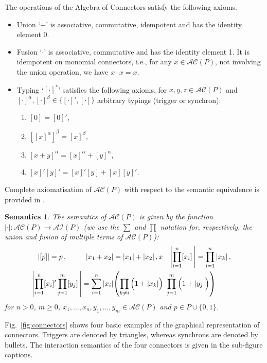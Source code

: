 \documentclass{llncs}
\newcommand{\fig}[1]{Fig.~\ref{fig:#1}}
\newcommand{\ie}[1][\ ]{i.e.#1}
\newtheorem*{semantics}{Semantics}
\newcommand{\ai}{\ensuremath{\mathcal{AI}}}
\newcommand{\ac}{\ensuremath{\mathcal{AC}}}
\begin{document}
The operations of the Algebra of Connectors satisfy the following
axioms.
\begin{itemize}
\item Union `$+$' is associative, commutative, idempotent and has the identity element 0.
\item Fusion `$\cdot$' is associative, commutative and has the identity element 1. It is idempotent on monomial connectors, \ie[,] for any $x \in \ac(P)$, not involving the union operation, we have $x\cdot x = x$.
\item Typing `$[\cdot]^*$' satisfies the following axioms, for $x,y,z
  \in \ac(P)$ and $[\cdot]^\alpha,[\cdot]^\beta \in \bigl\{[\cdot]', [\cdot]\bigr\}$ arbitrary typings (trigger or synchron):
  \begin{enumerate}
  \item $[0] = [0]'$,
  \item $[[x]^\alpha]^\beta = [x]^\beta$,
  \item $[x + y]^\alpha = [x]^\alpha + [y]^\alpha$,
  \item $[x]'[y]' = [x]'[y] + [x][y]'$.
  \end{enumerate}
\end{itemize}
Complete axiomatisation of $\ac(P)$ with respect to the semantic
equivalence is provided in \cite{BliSif08-acp-tc}.

\begin{semantics}
The semantics of $\ac(P)$ is given by the function $|\cdot| : \ac(P)
\rightarrow \ai(P)$ (we use the $\sum$ and $\prod$ notation for,
respectively, the union and fusion of multiple terms of $\ac(P)$):
%
\begin{align}
  \label{eq:acap}
  |[p]| & = p\,,
  & |x_1 + x_2| & = |x_1| + |x_2|\,,x
  & \left|\prod_{i=1}^n [x_i]\,\right| & = \prod_{i=1}^n |x_k|\,,
  \\
  \label{eq:acaptrig}
  && \hspace{-2cm}\left|\prod_{i=1}^n [x_i]' \prod_{j=1}^m [y_j]\,\right| = 
  \sum_{i=1}^n |x_i| & \lefteqn{\left(
  \prod_{k\not=i}\Big(1 + |x_k|\Big)\ \prod_{j=1}^m \Big(1 + |y_j|\Big)\right)}\,
\end{align}
%
for $n > 0$, $m \geq 0$, $x_1,\dots,x_n,y_1,\dots,y_m \in \ac(P)$ and
$p\in P\cup \{0,1\}$.
\end{semantics}

\fig{connectors} shows four basic examples of the graphical
representation of connectors.  Triggers are denoted by triangles,
whereas synchrons are denoted by bullets.  The interaction semantics
of the four connectors is given in the sub-figure captions.
\end{document}
